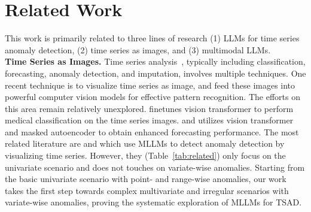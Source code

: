 \section{Related Work}
\label{sec:related}
\vspace{-0.2cm}
This work is primarily related to three lines of research (1) LLMs for time series anomaly detection, (2) time series as images, and (3) multimodal LLMs.
\\\textbf{Time Series as Images.}
Time series analysis~\cite{lee2024z,xu2024sst,du2024tsi,huang2024graph}, typically including classification, forecasting, anomaly detection, and imputation, involves multiple techniques. One recent technique is to visualize time series as image, and feed these images into powerful computer vision models for effective pattern recognition. The efforts on this area remain relatively unexplored. \cite{li2024time} finetunes vision transformer to perform medical classification on the time series images. \cite{yang2024vitime} and \cite{chen2024visionts} utilizes vision transformer and masked autoencoder to obtain enhanced forecasting performance. The most related literature are \cite{zhuang2024see} and \cite{zhou2024can} which use MLLMs to detect anomaly detection by visualizing time series. However, they (Table~\ref{tab:related}) only focus on the univariate scenario and does not touches on variate-wise anomalies. Starting from the basic univariate scenario with point- and range-wise anomalies, our work takes the first step towards complex multivariate and irregular scenarios with variate-wise anomalies, proving the systematic exploration of MLLMs for TSAD.

